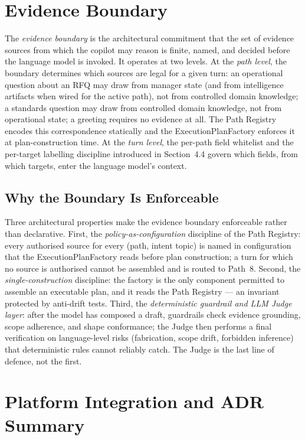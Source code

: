\section{Evidence Boundary}

The \textit{evidence boundary} is the architectural commitment that the set of evidence sources from which the copilot may reason is finite, named, and decided before the language model is invoked. It operates at two levels. At the \textit{path level}, the boundary determines which sources are legal for a given turn: an operational question about an RFQ may draw from manager state (and from intelligence artifacts when wired for the active path), not from controlled domain knowledge; a standards question may draw from controlled domain knowledge, not from operational state; a greeting requires no evidence at all. The Path Registry encodes this correspondence statically and the ExecutionPlanFactory enforces it at plan-construction time. At the \textit{turn level}, the per-path field whitelist and the per-target labelling discipline introduced in Section~4.4 govern which fields, from which targets, enter the language model's context.

\subsection{Why the Boundary Is Enforceable}
Three architectural properties make the evidence boundary enforceable rather than declarative. First, the \textit{policy-as-configuration} discipline of the Path Registry: every authorised source for every (path, intent topic) is named in configuration that the ExecutionPlanFactory reads before plan construction; a turn for which no source is authorised cannot be assembled and is routed to Path~8. Second, the \textit{single-construction} discipline: the factory is the only component permitted to assemble an executable plan, and it reads the Path Registry --- an invariant protected by anti-drift tests. Third, the \textit{deterministic guardrail and LLM Judge layer}: after the model has composed a draft, guardrails check evidence grounding, scope adherence, and shape conformance; the Judge then performs a final verification on language-level risks (fabrication, scope drift, forbidden inference) that deterministic rules cannot reliably catch. The Judge is the last line of defence, not the first.

\section{Platform Integration and ADR Summary}

